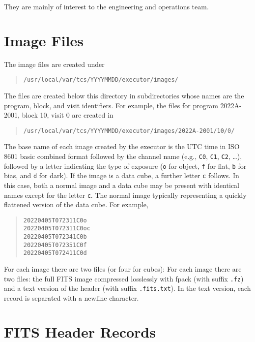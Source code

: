 They are mainly of interest to the engineering and operations team.

\section{Image Files}

The image files are created under

\begin{quote}
\verb|/usr/local/var/tcs/YYYYMMDD/executor/images/|
\end{quote}

The files are created below this directory in subdirectories whose names are the program, block, and visit identifiers. For example, the files for program 2022A-2001, block 10, visit 0 are created in

\begin{quote}
\verb|/usr/local/var/tcs/YYYYMMDD/executor/images/2022A-2001/10/0/|
\end{quote}

The base name of each image created by the executor is the UTC time in ISO 8601 basic combined format followed by the channel name (e.g., \verb|C0|, \verb|C1|, \verb|C2|, \ldots), followed by a letter indicating the type of exposure (\verb|o| for object, \verb|f| for flat, \verb|b| for bias, and \verb|d| for dark). 
\ifcoatli
If the image is a data cube, a further letter \verb|c| follows. In this case, both a normal image and a data cube may be present with identical names except for the letter \verb|c|. The normal image typically representing a quickly flattened version of the data cube.
\fi
For example,

\begin{quote}
\verb|20220405T072311C0o|\\
\ifcoatli
\verb|20220405T072311C0oc|\\
\fi
\verb|20220405T072341C0b|\\
\verb|20220405T072351C0f|\\
\verb|20220405T072411C0d|
\end{quote}

\ifcoatli
For each image there are two files (or four for cubes): 
\fi
\ifddoti
For each image there are two files: 
\fi
the full FITS image compressed losslessly with fpack (with suffix \verb|.fz|) and a text version of the header (with suffix \verb|.fits.txt|). In the text version, each record is separated with a newline character.

\section{FITS Header Records}

